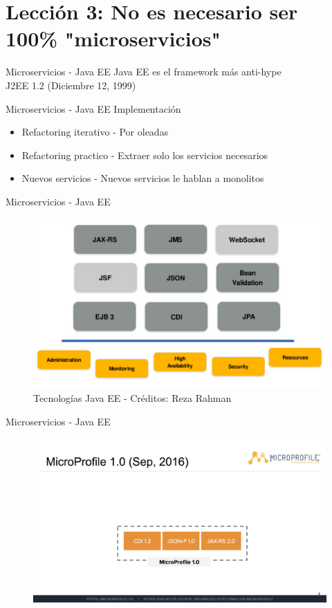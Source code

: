 \documentclass{beamer}
\begin{document}
\section{Lección 3: No es necesario ser 100\% "microservicios"}
\begin{frame}{Microservicios - Java EE}
Java EE es el framework más anti-hype \\

\huge J2EE 1.2 (Diciembre 12, 1999)
\end{frame}


\begin{frame}{Microservicios - Java EE}
Implementación
\begin{itemize}
\item Refactoring iterativo - Por oleadas
\item Refactoring practico - Extraer solo los servicios necesarios
\item Nuevos servicios - Nuevos servicios le hablan a monolitos
\end{itemize}
\end{frame}


\begin{frame}{Microservicios - Java EE}

\begin{figure}
\centering
\includegraphics[width=0.9\linewidth]{Images/javaeemicropancake.png}
\caption{Tecnologías Java EE - Créditos: Reza Rahman}
\end{figure}
\end{frame}

\begin{frame}{Microservicios - Java EE}
\begin{figure}
\centering
\includegraphics[width=\linewidth]{Images/mp1}
\end{figure}
\end{frame}
\end{document}
